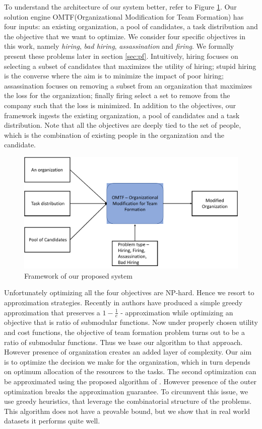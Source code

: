 To understand the architecture of our system better, refer to Figure \ref{fig:hpo}. Our solution engine OMTF(Organizational Modification for Team Formation) has four inputs: an existing organization, a pool of candidates, a task distribution and the objective that we want to optimize. We consider four specific objectives in this work, namely \textit{hiring}, \textit{bad hiring}, \textit{assassination} and \textit{firing}. We formally present these problems later in section \ref{sec:pf}. Intuitively, hiring focuses on selecting a subset of candidates that maximizes the utility of hiring; stupid hiring is the converse where the aim is to minimize the impact of poor hiring; assassination focuses on removing a subset from an organization that maximizes the loss for the organization; finally firing select a set to remove from the company such that the loss is minimized. In addition to the objectives, our framework ingests the existing organization, a pool of candidates and a task distribution. Note that all the objectives are deeply tied to the set of people, which is the combination of existing people in the organization and the candidate.
\begin{figure}[h]
\centering
\begin{small}
\includegraphics[width=1.0\textwidth]{figs/illustration.pdf}
\caption{Framework of our proposed system}
\label{fig:hpo}
\end{small}
\end{figure} 

Unfortunately optimizing all the four objectives are NP-hard. Hence we resort to approximation strategies. Recently in \cite{bai2016algorithms} authors have produced a simple greedy approximation that preserves a $1 - \frac{1}{e}$ - approximation while optimizing an objective that is ratio of submodular functions. Now under properly chosen utility and cost functions, the objective of team formation problem turns out to be a ratio of submodular functions. Thus we base our algorithm to that approach. However presence of organization creates an added layer of complexity. Our aim is to optimize the decision we make for the organization, which in turn depends on optimum allocation of the resources to the tasks. The second optimization can be approximated using the proposed algorithm of \cite{bai2016algorithms}. However presence of the outer optimization breaks the approximation guarantee. To circumvent this issue, we use greedy heuristics, that leverage the combinatorial structure of the problems. This algorithm does not have a provable bound, but we show that in real world datasets it performs quite well.

